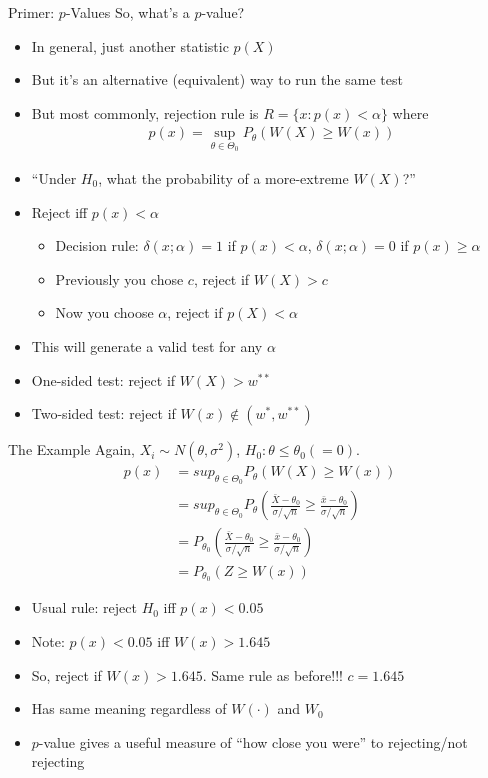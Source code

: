 \begin{frame}{Primer: $p$-Values}
So, what's a $p$-value?
\begin{itemize}
    \item In general, just another statistic $p(X)$
    \item But it's an alternative (equivalent) way to run the same test
    \item But most commonly, rejection rule is $R=\{x:p(x)< \alpha\}$ where
    \begin{align*}
        p(x)=\sup_{\theta\in\Theta_0} P_\theta(W(X)\geq W(x))
    \end{align*}
    \item ``Under $H_0$, what the probability of a more-extreme $W(X)$?''
    \item Reject iff $p(x)<\alpha$
    \begin{itemize}
        \item Decision rule: $\delta(x;\alpha)=1$ if $p(x)<\alpha$, $\delta(x;\alpha)=0$ if $p(x)\geq \alpha$
        \item Previously you chose $c$, reject if $W(X)> c$
        \item Now you choose $\alpha$, reject if $p(X)<\alpha$
    \end{itemize}
    \item This will generate a valid test for any $\alpha$
    \item One-sided test: reject if $W(X)>w^{**}$
    \item Two-sided test: reject if $W(x)\not\in (w^*,w^{**})$
\end{itemize}
\end{frame}

\begin{frame}{The Example}
Again, $X_i\sim N(\theta,\sigma^2)$, $H_0:\theta\leq \theta_0(=0)$.
\begin{align*}
    p(x) &= sup_{\theta\in\Theta_0} P_\theta(W(X)\geq W(x)) \\
    &= sup_{\theta\in\Theta_0} P_\theta\left( \frac{\bar{X}-\theta_0}{\sigma/\sqrt{n}} \geq \frac{\bar{x}-\theta_0}{\sigma/\sqrt{n}}\right)\\
    &= P_{\theta_0}\left( \frac{\bar{X}-\theta_0}{\sigma/\sqrt{n}} \geq \frac{\bar{x}-\theta_0}{\sigma/\sqrt{n}}\right) \\
    &= P_{\theta_0}\left( Z \geq W(x)\right)
\end{align*}
\begin{itemize}
    \item Usual rule: reject $H_0$ iff $p(x)<0.05$
    \item Note: $p(x)< 0.05$ iff $W(x)> 1.645$
    \item So, reject if $W(x)>1.645$. Same rule as before!!! $c=1.645$
    \item Has same meaning regardless of $W(\cdot)$ and $W_0$
    \item $p$-value gives a useful measure of ``how close you were'' to rejecting/not rejecting
\end{itemize}
\end{frame}

